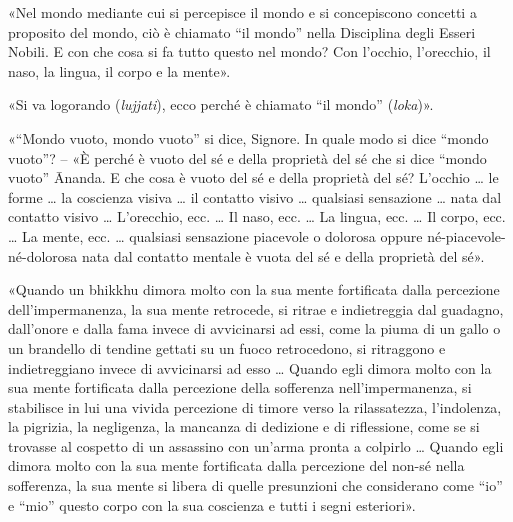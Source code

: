 

«Nel mondo mediante cui si percepisce il mondo e si concepiscono
concetti a proposito del mondo, ciò è chiamato “il mondo” nella
Disciplina degli Esseri Nobili. E con che cosa si fa tutto questo nel
mondo? Con l’occhio, l’orecchio, il naso, la lingua, il corpo e la
mente».




«Si va logorando (\emph{lujjati}), ecco perché è chiamato “il mondo”
(\emph{loka})».




«“Mondo vuoto, mondo vuoto” si dice, Signore. In quale modo si dice
“mondo vuoto”? – «È perché è vuoto del sé e della proprietà del sé che
si dice “mondo vuoto” Ānanda. E che cosa è vuoto del sé e della
proprietà del sé? L’occhio … le forme … la coscienza visiva … il
contatto visivo … qualsiasi sensazione … nata dal contatto visivo …
L’orecchio, ecc. … Il naso, ecc. … La lingua, ecc. … Il corpo, ecc. … La
mente, ecc. … qualsiasi sensazione piacevole o dolorosa oppure
né-piacevole-né-dolorosa nata dal contatto mentale è vuota del sé e
della proprietà del sé».




«Quando un bhikkhu dimora molto con la sua mente fortificata dalla
percezione dell’impermanenza, la sua mente retrocede, si ritrae e
indietreggia dal guadagno, dall’onore e dalla fama invece di avvicinarsi
ad essi, come la piuma di un gallo o un brandello di tendine gettati su
un fuoco retrocedono, si ritraggono e indietreggiano invece di
avvicinarsi ad esso … Quando egli dimora molto con la sua mente
fortificata dalla percezione della sofferenza nell’impermanenza, si
stabilisce in lui una vivida percezione di timore verso la rilassatezza,
l’indolenza, la pigrizia, la negligenza, la mancanza di dedizione e di
riflessione, come se si trovasse al cospetto di un assassino con un’arma
pronta a colpirlo … Quando egli dimora molto con la sua mente
fortificata dalla percezione del non-sé nella sofferenza, la sua mente
si libera di quelle presunzioni che considerano come “io” e “mio” questo
corpo con la sua coscienza e tutti i segni esteriori».




